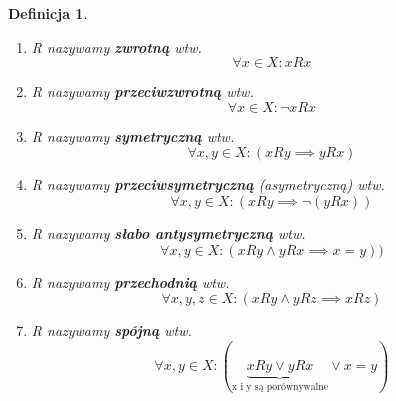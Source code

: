 \documentclass[a5paper,8pt]{article}
\theoremstyle{mythmstyle}
\newtheorem{definition}{Definicja}[section]
\begin{document}
\begin{definition}
                \begin{enumerate}
                    \item R nazywamy \textbf{zwrotną} wtw.
                        \begin{equation*}
                             \forall x \in X : x R x
                         \end{equation*}
                    \item R nazywamy \textbf{przeciwzwrotną} wtw.
                        \begin{equation*}
                             \forall x \in X : \neg x R x
                         \end{equation*}
                    \item R nazywamy \textbf{symetryczną} wtw.
                        \begin{equation*}
                             \forall x, y \in X : ( x R y \implies y R x )
                         \end{equation*}
                    \item R nazywamy \textbf{przeciwsymetryczną} (asymetryczną) wtw.
                        \begin{equation*}
                             \forall x, y \in X : ( x R y \implies \neg(y R x) )
                         \end{equation*}
                    \item R nazywamy \textbf{słabo antysymetryczną} wtw.
                        \begin{equation*}
                             \forall x, y \in X : ( x R y \wedge y R x \implies x = y) )
                         \end{equation*}
                    \item R nazywamy \textbf{przechodnią} wtw.
                        \begin{equation*}
                             \forall x, y, z \in X : ( x R y \wedge y R z \implies x R z )
                         \end{equation*}
                    \item R nazywamy \textbf{spójną} wtw.
                        \begin{equation*}
                             \forall x, y \in X : ( \underbrace{x R y \vee y R x}_{\text{x i y są porównywalne}} \vee x = y )
                         \end{equation*}
                \end{enumerate}
            \end{definition}
\end{document}
